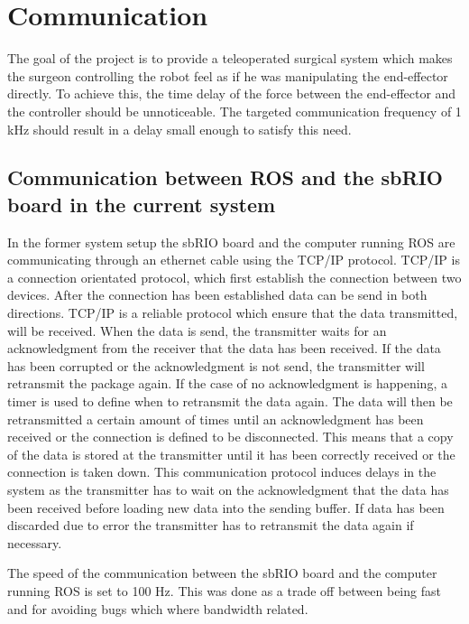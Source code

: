 \chapter{Communication}\label{cha:communication}

The goal of the project is to provide a teleoperated surgical system which makes the surgeon controlling the robot feel as if he was manipulating the end-effector directly. To achieve this, the time delay of the force between the end-effector and the controller should be unnoticeable. The targeted communication frequency of 1 kHz should result in a delay small enough to satisfy this need.

\section{Communication between ROS and the sbRIO board in the current system}


In the former system setup the sbRIO board and the computer running ROS are communicating through an ethernet cable using the TCP/IP protocol. TCP/IP is a connection orientated protocol, which first establish the connection between two devices. After the connection has been established data can be send in both directions. TCP/IP is a reliable protocol which ensure that the data transmitted, will be received. When the data is send, the transmitter waits for an acknowledgment from the receiver that the data has been received. If the data has been corrupted or the acknowledgment is not send, the transmitter will retransmit the package again. If the case of no acknowledgment is happening, a timer is used to define when to retransmit the data again. The data will then be retransmitted a certain amount of times until an acknowledgment has been received or the connection is defined to be disconnected. This means that a copy of the data is stored at the transmitter until it has been correctly received or the connection is taken down.
This communication protocol induces delays in the system as the transmitter has to wait on the acknowledgment that the data has been received before loading new data into the sending buffer. If data has been discarded due to error the transmitter has to retransmit the data again if necessary.  

The speed of the communication between the sbRIO board and the computer running ROS is set to 100 Hz. This was done as a trade off between being fast and for avoiding bugs which where bandwidth related\cite{Chris_Surgical}.



